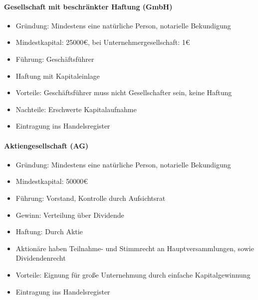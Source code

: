 \documentclass[titlepage,parskip=half]{scrartcl}
\begin{document}
\paragraph{Gesellschaft mit beschränkter Haftung (GmbH)}
\begin{itemize}
    \item Gründung: Mindestens eine natürliche Person, notarielle Bekundigung
    \item Mindestkapital: 25000€, bei Unternehmergesellschaft: 1€
    \item Führung: Geschäftsführer
    \item Haftung mit Kapitaleinlage
    \item Vorteile: Geschäftsführer muss nicht Gesellschafter sein, keine Haftung
    \item Nachteile: Erschwerte Kapitalaufnahme
    \item Eintragung ins Handelsregister
\end{itemize}

\paragraph{Aktiengesellschaft (AG)}
\begin{itemize}
    \item Gründung: Mindestens eine natürliche Person, notarielle Bekundigung
    \item Mindestkapital: 50000€
    \item Führung: Vorstand, Kontrolle durch Aufsichtsrat
    \item Gewinn: Verteilung über Dividende
    \item Haftung: Durch Aktie
    \item Aktionäre haben Teilnahme- und Stimmrecht an Hauptversammlungen, sowie Dividendenrecht
    \item Vorteile: Eignung für große Unternehmung durch einfache Kapitalgewinnung
    \item Eintragung ins Handelsregister
\end{itemize}
\end{document}
